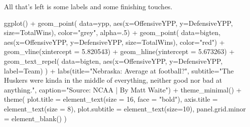 \documentclass[
]{book}
\newenvironment{Shaded}{\begin{snugshade}}{\end{snugshade}}
\newcommand{\AttributeTok}[1]{\textcolor[rgb]{0.77,0.63,0.00}{#1}}
\newcommand{\DecValTok}[1]{\textcolor[rgb]{0.00,0.00,0.81}{#1}}
\newcommand{\FloatTok}[1]{\textcolor[rgb]{0.00,0.00,0.81}{#1}}
\newcommand{\FunctionTok}[1]{\textcolor[rgb]{0.00,0.00,0.00}{#1}}
\newcommand{\NormalTok}[1]{#1}
\newcommand{\SpecialCharTok}[1]{\textcolor[rgb]{0.00,0.00,0.00}{#1}}
\newcommand{\StringTok}[1]{\textcolor[rgb]{0.31,0.60,0.02}{#1}}
\begin{document}
All that's left is some labels and some finishing touches.

\begin{Shaded}
\begin{Highlighting}[]
\FunctionTok{ggplot}\NormalTok{() }\SpecialCharTok{+} 
  \FunctionTok{geom\_point}\NormalTok{(}
    \AttributeTok{data=}\NormalTok{ypp, }
    \FunctionTok{aes}\NormalTok{(}\AttributeTok{x=}\NormalTok{OffensiveYPP, }\AttributeTok{y=}\NormalTok{DefensiveYPP, }\AttributeTok{size=}\NormalTok{TotalWins), }
    \AttributeTok{color=}\StringTok{"grey"}\NormalTok{, }
    \AttributeTok{alpha=}\NormalTok{.}\DecValTok{5}\NormalTok{) }\SpecialCharTok{+} 
  \FunctionTok{geom\_point}\NormalTok{(}
    \AttributeTok{data=}\NormalTok{bigten, }
    \FunctionTok{aes}\NormalTok{(}\AttributeTok{x=}\NormalTok{OffensiveYPP, }\AttributeTok{y=}\NormalTok{DefensiveYPP, }\AttributeTok{size=}\NormalTok{TotalWins), }
    \AttributeTok{color=}\StringTok{"red"}\NormalTok{) }\SpecialCharTok{+} 
  \FunctionTok{geom\_vline}\NormalTok{(}\AttributeTok{xintercept =} \FloatTok{5.820543}\NormalTok{) }\SpecialCharTok{+} 
  \FunctionTok{geom\_hline}\NormalTok{(}\AttributeTok{yintercept =} \FloatTok{5.673263}\NormalTok{) }\SpecialCharTok{+} 
  \FunctionTok{geom\_text\_repel}\NormalTok{(}
    \AttributeTok{data=}\NormalTok{bigten, }
    \FunctionTok{aes}\NormalTok{(}\AttributeTok{x=}\NormalTok{OffensiveYPP, }\AttributeTok{y=}\NormalTok{DefensiveYPP, }\AttributeTok{label=}\NormalTok{Team)}
\NormalTok{  ) }\SpecialCharTok{+}
  \FunctionTok{labs}\NormalTok{(}\AttributeTok{title=}\StringTok{"Nebraska: Average at football?"}\NormalTok{, }\AttributeTok{subtitle=}\StringTok{"The Huskers were kinda in the middle of everything, neither good nor bad at anything."}\NormalTok{, }\AttributeTok{caption=}\StringTok{"Source: NCAA | By Matt Waite"}\NormalTok{)  }\SpecialCharTok{+} \FunctionTok{theme\_minimal}\NormalTok{() }\SpecialCharTok{+} 
  \FunctionTok{theme}\NormalTok{(}
    \AttributeTok{plot.title =} \FunctionTok{element\_text}\NormalTok{(}\AttributeTok{size =} \DecValTok{16}\NormalTok{, }\AttributeTok{face =} \StringTok{"bold"}\NormalTok{),}
    \AttributeTok{axis.title =} \FunctionTok{element\_text}\NormalTok{(}\AttributeTok{size =} \DecValTok{8}\NormalTok{), }
    \AttributeTok{plot.subtitle =} \FunctionTok{element\_text}\NormalTok{(}\AttributeTok{size=}\DecValTok{10}\NormalTok{), }
    \AttributeTok{panel.grid.minor =} \FunctionTok{element\_blank}\NormalTok{()}
\NormalTok{    )}
\end{Highlighting}
\end{Shaded}
\end{document}
